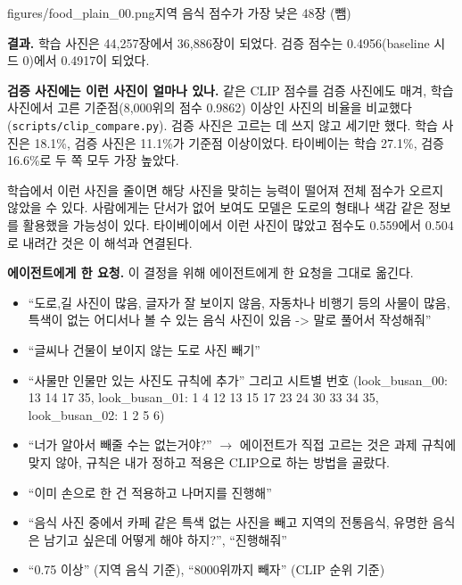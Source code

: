 \documentclass[11pt]{article}
\begin{document}
%
{figures/food_plain_00.png}{지역 음식 점수가 가장 낮은 48장 (뺌)}

\textbf{결과.} 학습 사진은 44,257장에서 36,886장이 되었다. 검증 점수는 0.4956(baseline
시드 0)에서 0.4917이 되었다.


\textbf{검증 사진에는 이런 사진이 얼마나 있나.} 같은 CLIP 점수를 검증 사진에도 매겨,
학습 사진에서 고른 기준점(8,000위의 점수 0.9862) 이상인 사진의 비율을 비교했다
(\texttt{scripts/clip\_compare.py}). 검증 사진은 고르는 데 쓰지 않고 세기만 했다.
학습 사진은 18.1\%, 검증 사진은 11.1\%가 기준점 이상이었다. 타이베이는 학습 27.1\%,
검증 16.6\%로 두 쪽 모두 가장 높았다.


학습에서 이런 사진을 줄이면 해당 사진을 맞히는 능력이 떨어져 전체 점수가 오르지 않았을 수
있다. 사람에게는 단서가 없어 보여도 모델은 도로의 형태나 색감 같은 정보를 활용했을 가능성이
있다. 타이베이에서 이런 사진이 많았고 점수도 0.559에서 0.504로 내려간 것은 이 해석과
연결된다.

\textbf{에이전트에게 한 요청.} 이 결정을 위해 에이전트에게 한 요청을 그대로 옮긴다.
\begin{itemize}
\item ``도로,길 사진이 많음, 글자가 잘 보이지 않음, 자동차나 비행기 등의 사물이 많음,
  특색이 없는 어디서나 볼 수 있는 음식 사진이 있음 -> 말로 풀어서 작성해줘''
\item ``글씨나 건물이 보이지 않는 도로 사진 빼기''
\item ``사물만 인물만 있는 사진도 규칙에 추가'' 그리고 시트별 번호 (look\_busan\_00:
  13 14 17 35, look\_busan\_01: 1 4 12 13 15 17 23 24 30 33 34 35, look\_busan\_02: 1 2 5 6)
\item ``너가 알아서 빼줄 수는 없는거야?'' $\rightarrow$ 에이전트가 직접 고르는 것은 과제
  규칙에 맞지 않아, 규칙은 내가 정하고 적용은 CLIP으로 하는 방법을 골랐다.
\item ``이미 손으로 한 건 적용하고 나머지를 진행해''
\item ``음식 사진 중에서 카페 같은 특색 없는 사진을 빼고 지역의 전통음식, 유명한 음식은
  남기고 싶은데 어떻게 해야 하지?'', ``진행해줘''
\item ``0.75 이상'' (지역 음식 기준), ``8000위까지 빼자'' (CLIP 순위 기준)
\end{itemize}

\end{document}
